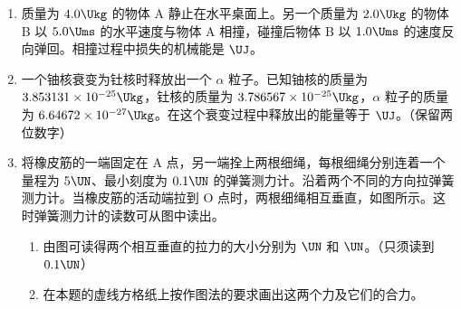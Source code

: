 \documentclass[\gkver]{gaokaozhenti}
\begin{document}
\begin{enumerate}
{（3）若电子是在 $t=\frac{3}{8}T$ 时刻进入，则电子先向 B 板运动，然后再折向 A 板运动，但向 A 板运动到小孔时，速度仍在增大，故电子只能从 A 孔返回，不能打在 B 板上，故 C 错误；

（4）若电子是在 $t=\frac{1}{2}T$ 时刻进入电场，电子开始就受力向 A 板返回，不能在电场中运动，故 D 错误。
}

\item
质量为 $4.0\Ukg$ 的物体 A 静止在水平桌面上。另一个质量为 $2.0\Ukg$ 的物体 B 以 $5.0\Ums$ 的水平速度与物体 A 相撞，碰撞后物体 B 以 $1.0\Ums$ 的速度反向弹回。相撞过程中损失的机械能是 $\UJ$。



\item
一个铀核衰变为钍核时释放出一个 $\alpha$ 粒子。已知铀核的质量为 $3.853131 \times 10^{-25}\Ukg$，钍核的质量为 $3.786567 \times 10^{-25}\Ukg$，$\alpha$ 粒子的质量为 $6.64672 \times 10^{-27}\Ukg$。在这个衰变过程中释放出的能量等于 $\UJ$。（保留两位数字）



\item
将橡皮筋的一端固定在 A 点，另一端拴上两根细绳，每根细绳分别连着一个量程为 $5\UN$、最小刻度为 $0.1\UN$ 的弹簧测力计。沿着两个不同的方向拉弹簧测力计。当橡皮筋的活动端拉到 O 点时，两根细绳相互垂直，如图所示。这时弹簧测力计的读数可从图中读出。
\begin{enumerate}
	\item
	由图可读得两个相互垂直的拉力的大小分别为 $\UN$ 和 $\UN$。（只须读到 $0.1\UN$）
	\item
	在本题的虚线方格纸上按作图法的要求画出这两个力及它们的合力。
\end{enumerate}


\end{enumerate}
\end{document}

